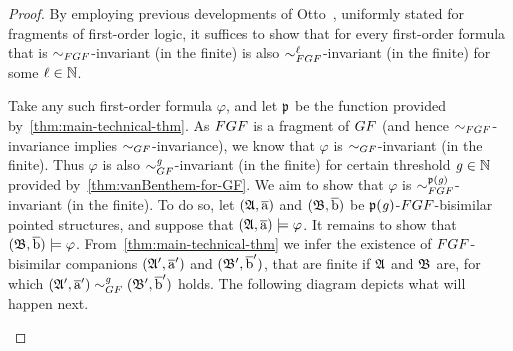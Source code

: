 \begin{proof}
By employing previous developments of Otto~\cite[Obs.~13]{Otto04}, uniformly stated for fragments of first-order logic, it suffices to show that for every first-order formula that is $\bisimto_{\FGF}$-invariant (in the finite) is also $\bisimto_{\FGF}^{\ell}$-invariant (in the finite) for some $\ell \in {\mathbb{N}}$.

Take any such first-order formula $\varphi$, and let $\mathfrak{p}$ be the function provided by~\cref{thm:main-technical-thm}.
As $\FGF$ is a fragment of $\GF$ (and hence $\bisimto_{\FGF}$-invariance implies $\bisimto_{\GF}$-invariance), we know that $\varphi$ is $\bisimto_{\GF}$-invariant (in the finite).
Thus $\varphi$ is also $\bisimto_{\GF}^{\mathit{g}}$-invariant (in the finite) for certain threshold $\mathit{g} \in {\mathbb{N}}$ provided by~\cref{thm:vanBenthem-for-GF}.
We aim to show that $\varphi$ is $\bisimto_{\FGF}^{\homop(\mathit{g})}$-invariant (in the finite).
To do so, let $({\mathfrak{A}}, \overline{\mathrm{a}})$ and $({\mathfrak{B}}, \overline{\mathrm{b}})$ be $\mathfrak{p}(\mathit{g})$-$\FGF$-bisimilar pointed structures, and suppose that $({\mathfrak{A}}, \overline{\mathrm{a}}) \models \varphi$. It remains to show that $({\mathfrak{B}}, \overline{\mathrm{b}}) \models \varphi$.
From~\cref{thm:main-technical-thm} we infer the existence of $\FGF$-bisimilar companions $({\mathfrak{A}}', \overline{\mathrm{a}}')$ and $({\mathfrak{B}}', \overline{\mathrm{b}}')$, that are finite if ${\mathfrak{A}}$ and ${\mathfrak{B}}$ are, for which $(\str{A}', \elemtuplea') \bisimto^{\mathit{g}}_{\GF} (\str{B}', \elemtupleb')$ holds.
The following diagram depicts what will happen next.
\begin{figure}[H]
  \centering
\end{figure}
\end{proof}

